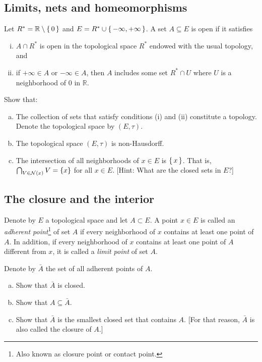 \begin{center}
  \section{Limits, nets and homeomorphisms}
\end{center}

\setcounter{section}{2}
\begin{qst}
Let $R^* = \mathbb R \setminus \set{0}$ and $E = R^* \cup \set{-\infty,+\infty}$. A set $A \subseteq E$ is open if it satisfies
\begin{enumerate}[i.]
  \item $A \cap R^*$ is open in the topological space $R^*$ endowed with the usual topology, and 
  \item if $+\infty \in A$ or $-\infty \in A$, then $A$ includes some set   $R^* \cap U$ where $U$ is a neighborhood of $0$ in $\mathbb R$.
\end{enumerate}
Show that:
\begin{enumerate}[(a)]
  \item The collection of sets that satisfy conditions (i) and (ii) constitute a topology. Denote the topological space by $(E,\tau)$.
  \item The topological space $(E,\tau)$ is non-Hausdorff.
  \item The intersection of all neighborhoods of $x \in E$ is $\set{x}$. That is,
     $\bigcap_{V \in \mathcal{N}(x)} V = \{x\}$ for all $x \in E$. [Hint: What are the closed sets in $E$?] 
\end{enumerate}  
\end{qst}


\subsection{The closure and the interior}

Denote by $E$ a topological space and let $A \subset E$. 
A point $x \in E$ is called an
\textit{adherent point}\footnote{Also known as closure point or contact point.}
of set $A$ if every neighborhood of $x$  
contains at least one point of $A$.
In addition, if every neighborhood of $x$  
contains at least one point of $A$ different from $x$, 
it is called a \textit{limit point} of set $A$. 

\begin{qst}
  Denote by $\bar A$ the set of all adherent points of $A$.
\begin{enumerate}[(a)]
  \item Show that $\bar A$ is closed.
  \item Show that $A \subseteq \bar A$.
  \item Show that $\bar A$ is the smallest closed set that contains $A$. [For that reason, $\bar A$ is also called the closure of $A$.]
\end{enumerate} 
\end{qst}

